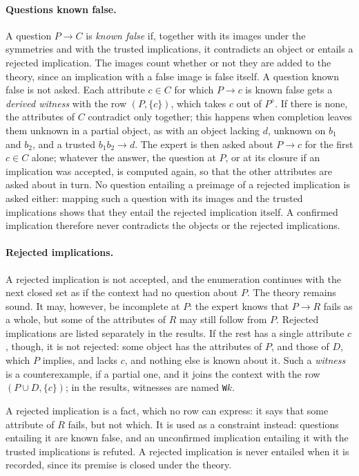 \documentclass[11pt,a4paper]{article}
\theoremstyle{definition}
\theoremstyle{remark}
\newcommand{\code}[1]{\texttt{#1}}
\begin{document}
\paragraph{Questions known false.}
A question $P \to C$ is \emph{known false} if, together with its images under the symmetries and with the trusted implications, it contradicts an object or entails a rejected implication. The images count whether or not they are added to the theory, since an implication with a false image is false itself. A question known false is not asked. Each attribute $c \in C$ for which $P \to c$ is known false gets a \emph{derived witness} with the row $(P, \{c\})$, which takes $c$ out of $P^{\diamond}$. If there is none, the attributes of $C$ contradict only together; this happens when completion leaves them unknown in a partial object, as with an object lacking $d$, unknown on $b_1$ and $b_2$, and a trusted $b_1 b_2 \to d$. The expert is then asked about $P \to c$ for the first $c \in C$ alone; whatever the answer, the question at $P$, or at its closure if an implication was accepted, is computed again, so that the other attributes are asked about in turn. No question entailing a preimage of a rejected implication is asked either: mapping such a question with its images and the trusted implications shows that they entail the rejected implication itself. A confirmed implication therefore never contradicts the objects or the rejected implications.

\paragraph{Rejected implications.}
A rejected implication is not accepted, and the enumeration continues with the next closed set as if the context had no question about $P$. The theory remains sound. It may, however, be incomplete at $P$: the expert knows that $P \to R$ fails as a whole, but some of the attributes of $R$ may still follow from $P$. Rejected implications are listed separately in the results. If the rest has a single attribute $c$, though, it is not rejected: some object has the attributes of $P$, and those of $D$, which $P$ implies, and lacks $c$, and nothing else is known about it. Such a \emph{witness} is a counterexample, if a partial one, and it joins the context with the row $(P \cup D, \{c\})$; in the results, witnesses are named \code{W}$k$.

A rejected implication is a fact, which no row can express: it says that some attribute of $R$ fails, but not which. It is used as a constraint instead: questions entailing it are known false, and an unconfirmed implication entailing it with the trusted implications is refuted. A rejected implication is never entailed when it is recorded, since its premise is closed under the theory.
\end{document}
